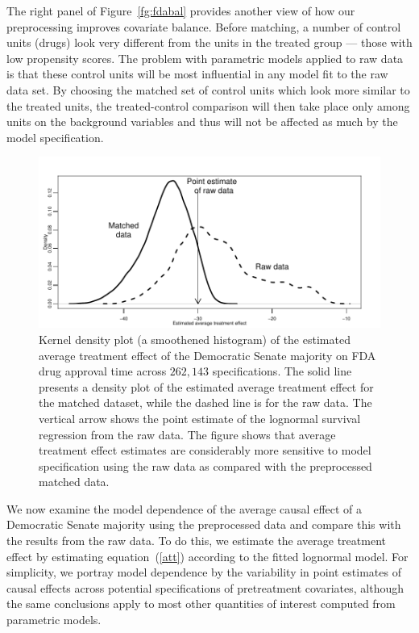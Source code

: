 \documentclass[11pt,titlepage]{article}
\begin{document}
The right panel of Figure~\ref{fg:fdabal} provides another view of how
our preprocessing improves covariate balance.  Before matching, a
number of control units (drugs) look very different from the units in
the treated group --- those with low propensity scores.  The problem
with parametric models applied to raw data is that these control units
will be most influential in any model fit to the raw data set.  By
choosing the matched set of control units which look more similar to
the treated units, the treated-control comparison will then take place
only among units on the background variables and thus will not be
affected as much by the model specification.
\begin{figure}[t] 
 \begin{center}
   \includegraphics{figs/fdadens.pdf}
  \end{center}
  \vspace{-0.275in}
  \caption{Kernel density plot (a smoothened histogram)
    of the estimated average treatment effect of the Democratic Senate
    majority on FDA drug approval time across $262,143$
    specifications. The solid line presents a density plot of the
    estimated average treatment effect for the matched dataset, while
    the dashed line is for the raw data.  The vertical arrow shows the
    point estimate of the lognormal survival regression from the raw
    data.  The figure shows that average treatment effect estimates
    are considerably more sensitive to model specification using the
    raw data as compared with the preprocessed matched data.}
  \label{fg:fdadens}
\end{figure}

We now examine the model dependence of the average causal effect of a
Democratic Senate majority using the preprocessed data and compare
this with the results from the raw data.  To do this, we estimate the
average treatment effect by estimating equation~(\ref{att}) according
to the fitted lognormal model.  For simplicity, we portray model
dependence by the variability in point estimates of causal effects
across potential specifications of pretreatment covariates, although
the same conclusions apply to most other quantities of interest
computed from parametric models.
\end{document}
